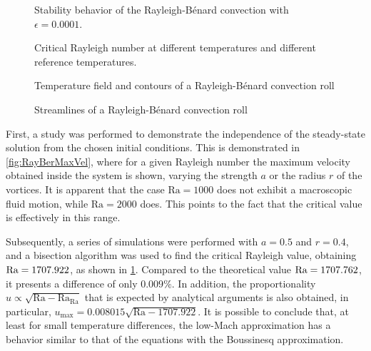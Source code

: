 \begin{figure}[bt]
	\centering
	\caption{Stability behavior of the Rayleigh-Bénard convection with $\epsilon = 0.0001$.} \label{fig:ReyBerCritRa}
\end{figure}
\begin{figure}[bt]
	\pgfplotsset{width=0.45\textwidth, compat=1.3}
	\centering
\caption{Critical Rayleigh number at different temperatures and different reference temperatures.}\label{fig:RayBenardTemperatureRaPlot}
\end{figure}
\begin{figure}[h]
	\centering
	\pgfplotsset{width=0.31\textwidth, compat=1.3}
	\par\bigskip
	\caption{Temperature field and contours of a Rayleigh-Bénard convection roll} \label{fig:RayBenTemperatureField}
\end{figure}
\begin{figure}[h!]
	\centering
	\pgfplotsset{width=0.31\textwidth, compat=1.3}
	\par\bigskip
	\caption{Streamlines of a Rayleigh-Bénard convection roll} \label{fig:RayBenStreamlines}
\end{figure}
First, a study was performed to demonstrate the independence of the steady-state solution from the chosen initial conditions. This is demonstrated in \cref{fig:RayBerMaxVel}, where for a given Rayleigh number the maximum velocity obtained inside the system is shown, varying the strength $a$ or the radius $r$ of the vortices. It is apparent that the case $\text{Ra} = 1000$ does not exhibit a macroscopic fluid motion, while $\text{Ra} = 2000$ does. This points to the fact that the critical value is effectively in this range. 

Subsequently, a series of simulations were performed with $a = 0.5$ and $r = 0.4$, and a bisection algorithm was used to find the critical Rayleigh value, obtaining $\text{Ra} = 1707.922$, as shown in \cref{fig:ReyBerCritRa}. Compared to the theoretical value $\text{Ra} = 1707.762$, it presents a difference of only $0.009\%$. In addition, the proportionality  $u \propto \sqrt{\text{Ra}- \text{Ra}_\text{Ra}}$  that is expected by analytical arguments is also obtained, in particular, $u_{\text{max}}  = 0.008015\sqrt{\text{Ra} - 1707.922}$. It is possible to conclude that, at least for small temperature differences, the low-Mach approximation has a behavior similar to that of the equations with the Boussinesq approximation. 

